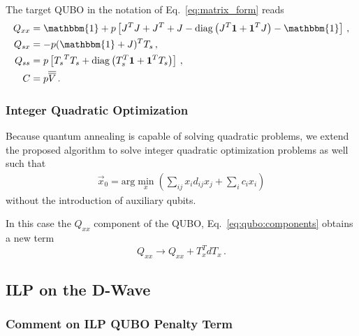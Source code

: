 \documentclass[prd,twocolumn,tightenlines,preprintnumbers,showpacs,superscriptaddress,notitlepage,nofootinbib,eqsecnum,floatfix,longbibliography,aps,10pt]{revtex4-1}
\begin{document}
The target QUBO in the notation of Eq.~\eqref{eq:matrix_form} reads
 {\small
  \begin{align}
   Q_{xx} & = \mathbbm{1} + p\left[J^T J + J^T + J - \mathrm{diag}\left(J^T \vec 1 + \vec 1^T J\right) - \mathbbm{1} \right] \,, \\
   Q_{sx} & = - p(\mathbbm{1}+J)^TT_s\,,                                                                     \\
   Q_{ss} & = p\left[{T_s}^T T_s + \mathrm{diag}\left(T_s^T \vec 1 + \vec 1^T  T_s\right)\right]\,,                                  \\
   C      & =  p \overline{\overline{V}}\,.
  \end{align}}

\subsubsection{Integer Quadratic Optimization}
\label{sec:methods:ilp:quadratic}

Because quantum annealing is capable of solving quadratic problems, we extend the proposed algorithm to solve integer quadratic optimization problems as well such that
\begin{align}
 \vec x_0 = \mathrm{arg}\min\limits_{x}\left(\sum_{ij} x_i d_{ij} x_j + \sum_i c_i x_i\right)
\end{align}
without the introduction of auxiliary qubits.

In this case the $Q_{xx}$ component of the QUBO, Eq.~\eqref{eq:qubo:components} obtains a new term
\begin{equation}
    Q_{xx} \to Q_{xx} + T_x^T d T_x \, .
\end{equation}

\subsection{ILP on the D-Wave}
\label{sec:methods:ILP-on-D-Wave}

\subsubsection{Comment on ILP QUBO Penalty Term}
\label{sec:methods:ilp-qubo-comments}
\end{document}
